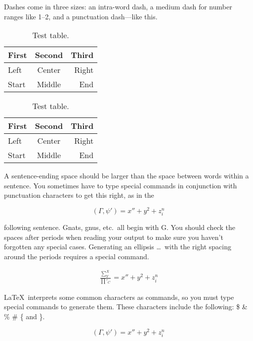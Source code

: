 \documentclass[twocolumn]{article}
\newcommand{\ip}[2]{(#1, #2)}
\begin{document}
Dashes come in three sizes: an  intra-word  dash, a medium dash for
number ranges like  1--2,  and a punctuation  dash---like  this.
\begin{table}%
\centering
\begin{tabular}{l|c|r}
\hline
First & Second & Third \\
\hline
Left & Center & Right \\
Start & Middle& End\\
\hline
\end{tabular}
\caption{Test table.}
\end{table}
\begin{table*}%
\tabcolsep=20pt
\centering
\begin{tabular}{l|c|r}
\hline
First & Second & Third \\
\hline
Left & Center & Right \\
Start & Middle& End\\
\hline
\end{tabular}
\caption{Test table.}
\end{table*}

A sentence-ending space should be larger than the space between words
within a sentence. You sometimes have to type special commands in
conjunction with punctuation characters to get this right, as in the
\begin{gridenv}
\begin{equation}
\ip{\Gamma}{\psi'} = x'' + y^{2} + z_{i}^{n}\label{eq1}
\end{equation}
\end{gridenv}
following sentence. Gnats, gnus, etc.\ all begin with G\@.  You should
check the spaces after periods when reading your output to make sure
you haven't forgotten any special cases. Generating an ellipsis
\ldots\ with the right spacing around the periods requires a special
command.
\begin{gridenv}
\begin{eqnarray}
\frac{\sum^X_Y}{\prod'_C} = x'' + y^{2} + z_{i}^{n}\label{eq2}%
\end{eqnarray}
\end{gridenv}
\LaTeX\ interprets some common characters as commands, so you must
type special commands to generate them. These characters include the
following: \$ \& \% \# \{ and \}.
\begin{gridenv}
\begin{equation}
\ip{\Gamma}{\psi'} = x'' + y^{2} + z_{i}^{n}\label{eq5}
\end{equation}
\end{gridenv}
\end{document}

